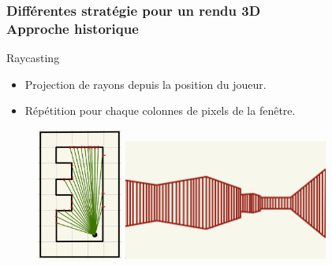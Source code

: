 \documentclass{beamer}
\begin{document}
\begin{frame}
    \frametitle{Différentes stratégie pour un rendu 3D \\
                \small Approche historique}
    \begin{block}{Raycasting}
        \begin{itemize}
            \item Projection de rayons depuis la position du joueur.
            \item Répétition pour chaque colonnes de pixels de la fenêtre.
        \end{itemize}
    \end{block}

    \begin{figure}
        \center
        \includegraphics[width=0.25\textwidth]{images/projection2D.jpeg}
        \raisebox{2cm}{
            \hspace{2mm}$\Longrightarrow$\hspace{2mm}
        }
        \includegraphics[width=0.6\textwidth]{images/rendu-historique.jpg}
    \end{figure}
\end{frame}
\end{document}

